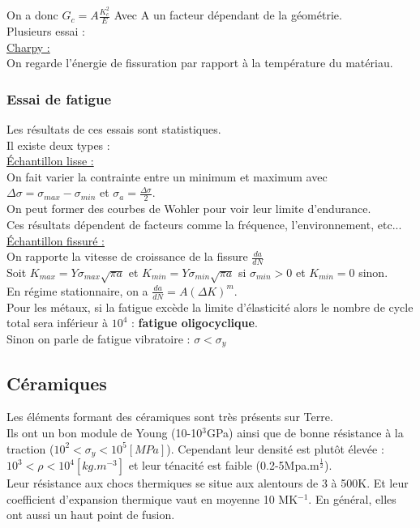 \documentclass[../main.tex]{subfiles}
\begin{document}
On a donc $ G_c = A\frac{K_c^2}{E}$ Avec A un facteur dépendant de la géométrie.\\

Plusieurs essai : \\
\quad \underline{Charpy :}\\
On regarde l'énergie de fissuration par rapport à la température du matériau.\\

\subsubsection{Essai de fatigue}
\warning Les résultats de ces essais sont statistiques.\\

Il existe deux types :\\
\quad \underline{Échantillon lisse :}\\
On fait varier la contrainte entre un minimum et maximum avec $\Delta \sigma = \sigma_{max}-\sigma_{min}$ et $\sigma_a = \frac{\Delta \sigma}{2}$.\\
On peut former des courbes de Wohler pour voir leur limite d'endurance.\\

Ces résultats dépendent de facteurs comme la fréquence, l'environnement, etc...\\

\quad \underline{Échantillon fissuré :}\\
On rapporte la vitesse de croissance de la fissure $\frac{da}{dN}$\\
Soit $K_{max} = Y\sigma_{max} \sqrt{\pi a}$ et $K_{min} = Y\sigma_{min} \sqrt{\pi a}$ si $\sigma_{min}>0$ et $K_{min} = 0$ sinon.\\
En régime stationnaire, on a $\frac{da}{dN} = A(\Delta K)^m$.\\

Pour les métaux, si la fatigue excède la limite d'élasticité alors le nombre de cycle total sera inférieur à $10^4$ : \textbf{fatigue oligocyclique}.\\
Sinon on parle de fatigue vibratoire : $\sigma < \sigma_y$\\

\subsection{Céramiques}
Les éléments formant des céramiques sont très présents sur Terre.\\
Ils ont un bon module de Young (10-10$^3$GPa) ainsi que de bonne résistance à la traction ($10^2 < \sigma_y < 10^5 [MPa]$). Cependant leur densité est plutôt élevée : $10^3 < \rho < 10^4 [kg.m^{-3}]$ et leur ténacité est faible (0.2-5Mpa.m$^{\frac{1}{2}}$).\\
Leur résistance aux chocs thermiques se situe aux alentours de 3 à 500K. Et leur coefficient d'expansion thermique vaut en moyenne 10 MK$^{-1}$. En général, elles ont aussi un haut point de fusion.\\
\end{document}
